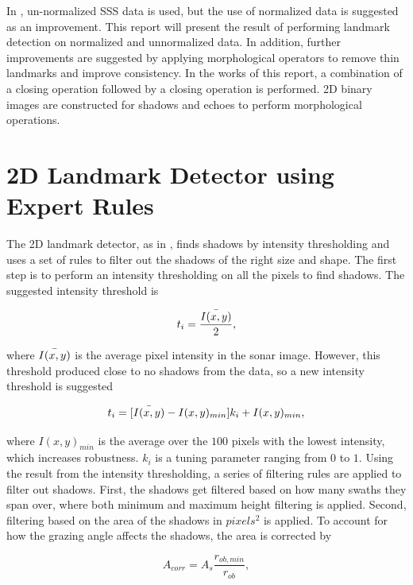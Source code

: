 In \cite{Al-Rawi2017LandmarkImages}, un-normalized SSS data is used, but the use of normalized data is suggested as an improvement. This report will present the result of performing landmark detection on normalized and unnormalized data. In addition, further improvements are suggested by applying morphological operators to remove thin landmarks and improve consistency. In the works of this report, a combination of a closing operation followed by a closing operation is performed. 2D binary images are constructed for shadows and echoes to perform morphological operations.  

\section{2D Landmark Detector using Expert Rules}

The 2D landmark detector, as in \cite{Leblond2019SonarProject}, finds shadows by intensity thresholding and uses a set of rules to filter out the shadows of the right size and shape. The first step is to perform an intensity thresholding on all the pixels to find shadows. The suggested intensity threshold is

\begin{equation}
    t_i = \frac{\Bar{I(x,y)}}{2},
    \label{eq:orginal_int_thres}
\end{equation}

where $\Bar{I(x,y)}$ is the average pixel intensity in the sonar image. However, this threshold produced close to no shadows from the data, so a new intensity threshold is suggested

\begin{equation}
    t_i = [\Bar{I(x,y)} - I(x,y)_{min}] k_i + I(x,y)_{min},
\end{equation}

where $I(x,y)_{min}$ is the average over the $100$ pixels with the lowest intensity, which increases robustness. $k_i$ is a tuning parameter ranging from $0$ to $1$. Using the result from the intensity thresholding, a series of filtering rules are applied to filter out shadows. First, the shadows get filtered based on how many swaths they span over, where both minimum and maximum height filtering is applied. Second, filtering based on the area of the shadows in $pixels^2$ is applied. To account for how the grazing angle affects the shadows, the area is corrected by

\begin{equation}
    A_{corr} = A_s \frac{r_{ob,min}}{r_{ob}},
    \label{eq:corrected_area}
\end{equation}

